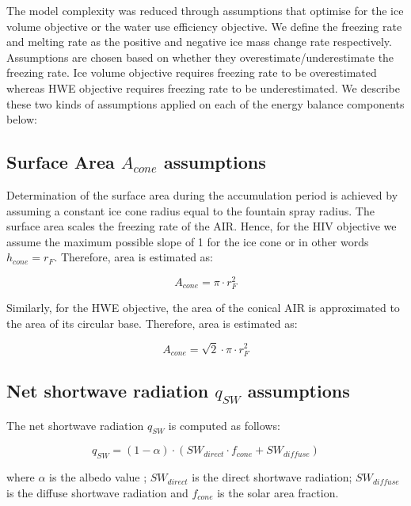 \documentclass[tc, manuscript]{copernicus}
\begin{document}
The model complexity was reduced through assumptions that optimise for the ice volume objective or the water use
efficiency objective. We define the freezing rate and melting rate as the positive and negative ice mass change
rate respectively. Assumptions are chosen based on whether they overestimate/underestimate the freezing rate.
Ice volume objective requires freezing rate to be overestimated whereas HWE objective requires freezing rate to
be underestimated. We describe these two kinds of assumptions applied on each of the energy balance components
below: 

\subsection{Surface Area $A_{cone}$ assumptions}

Determination of the surface area during the accumulation period is achieved by assuming a constant ice cone
radius equal to the fountain spray radius. The surface area scales the freezing rate of the AIR. Hence, for the
HIV objective we assume the maximum possible slope of 1 for the ice cone or in other words $h_{cone} = r_{F}$.
Therefore, area is estimated as:  

\begin{equation} A_{cone} =\pi \cdot r_{F}^2 \label{eq:Area} \end{equation}

Similarly, for the HWE objective, the area of the conical AIR is approximated to the area of its circular
base. Therefore, area is estimated as:

\begin{equation} A_{cone} =\sqrt{2} \cdot \pi \cdot r_{F}^2 \label{eq:Area} \end{equation}

\subsection{Net shortwave radiation \texorpdfstring{$q_{SW}$}{Lg} assumptions}
\label{sec:SW}

The net shortwave radiation $q_{SW}$ is computed as follows:

\begin{equation} 
q_{SW} = (1- \alpha) \cdot ( SW_{direct} \cdot f_{cone} + SW_{diffuse})
\label{eqn:SW} 
\end{equation}

where $\alpha$ is the albedo value ; $SW_{direct}$ is the direct shortwave radiation; $SW_{diffuse}$ is the
diffuse shortwave radiation and $f_{cone}$ is the solar area fraction.
\end{document}
